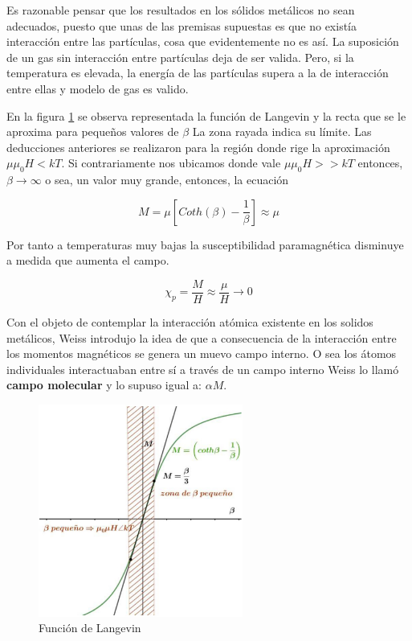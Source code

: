 Es razonable pensar que los resultados en los sólidos metálicos no sean adecuados, puesto que unas de las premisas supuestas es que no existía interacción entre las partículas, cosa que evidentemente no es así. La suposición de un gas sin interacción entre partículas deja de ser valida. Pero, si la temperatura es elevada, la energía de las partículas supera a la de interacción entre ellas y modelo de gas es valido.

En la figura \ref{fig:c2} se observa representada la función de Langevin y la recta que se le aproxima para pequeños valores de $\beta$ La zona rayada indica su límite. Las deducciones anteriores se realizaron para la región donde rige la aproximación $\mu\mu_{0}H < kT$. Si contrariamente nos ubicamos donde vale $\mu\mu_{0}H >> kT$ entonces, $\beta\rightarrow\infty$ o sea, un valor muy grande, entonces, la ecuación

\begin{equation*}
	M= \mu \left[ Coth(\beta)-\dfrac{1}{\beta} \right] \approx \mu
\end{equation*}

Por tanto a temperaturas muy bajas la susceptibilidad paramagnética disminuye a medida que aumenta el campo. 

\begin{equation}
	\chi_{p} = \dfrac{M}{H} \approx \dfrac{\mu}{H}\rightarrow 0
\end{equation}


Con el objeto de contemplar la interacción atómica existente en los solidos metálicos, Weiss introdujo la idea de que a consecuencia de la interacción entre los momentos magnéticos se genera un muevo campo interno. O sea los átomos individuales interactuaban entre sí a través de un campo interno Weiss lo llamó \textbf{campo molecular} y lo supuso igual a: $\alpha M$.


\begin{figure}[H]
    \centering
    \includegraphics[width=0.6\textwidth]{./Figures/fig_c2}
	\caption{Función de Langevin}
	\label{fig:c2}
\end{figure}

